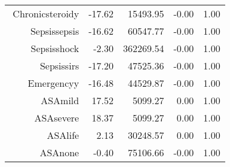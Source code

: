\begin{tabular}{rrrrr}
$$  Chronic\-steroid\-y & -17.62 & 15493.95 & -0.00 & 1.00 \\ 
  Sepsis\-sepsis & -16.62 & 60547.77 & -0.00 & 1.00 \\ 
  Sepsis\-shock & -2.30 & 362269.54 & -0.00 & 1.00 \\ 
  Sepsis\-sirs & -17.20 & 47525.36 & -0.00 & 1.00 \\ 
  Emergency\-y & -16.48 & 44529.87 & -0.00 & 1.00 \\ 
  ASA\-mild & 17.52 & 5099.27 & 0.00 & 1.00 \\ 
  ASA\-severe & 18.37 & 5099.27 & 0.00 & 1.00 \\ 
  ASA\-life & 2.13 & 30248.57 & 0.00 & 1.00 \\ 
  ASA\-none & -0.40 & 75106.66 & -0.00 & 1.00 \\ 
   \hline
\end{tabular}

